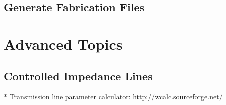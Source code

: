 \documentclass[12pt,letterpaper]{scrartcl}
\begin{document}
\subsection{Generate Fabrication Files}

\section{Advanced Topics}

\subsection{Controlled Impedance Lines}

* Transmission line parameter calculator: http://wcalc.sourceforge.net/

\newpage



\end{document}
